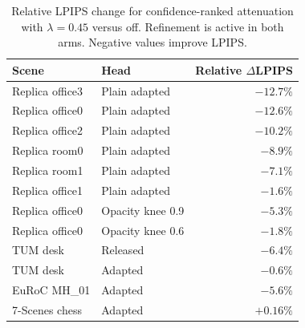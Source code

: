 \begin{table}[t]
\centering\small
\begin{tabular}{@{}llr@{}}
\toprule
Scene & Head & Relative $\Delta$LPIPS \\
\midrule
Replica office3 & Plain adapted & $-12.7\%$\\
Replica office0 & Plain adapted & $-12.6\%$\\
Replica office2 & Plain adapted & $-10.2\%$\\
Replica room0 & Plain adapted & $-8.9\%$\\
Replica room1 & Plain adapted & $-7.1\%$\\
Replica office1 & Plain adapted & $-1.6\%$\\
Replica office0 & Opacity knee 0.9 & $-5.3\%$\\
Replica office0 & Opacity knee 0.6 & $-1.8\%$\\
TUM desk & Released & $-6.4\%$\\
TUM desk & Adapted & $-0.6\%$\\
EuRoC MH\_01 & Adapted & $-5.6\%$\\
7-Scenes chess & Adapted & $+0.16\%$\\
\bottomrule
\end{tabular}
\caption[Fine-grained opacity attenuation ablation]{Relative LPIPS change
for confidence-ranked attenuation with $\lambda=0.45$ versus off.
Refinement is active in both arms. Negative values improve LPIPS.}
\label{tab:thinning}
\end{table}
